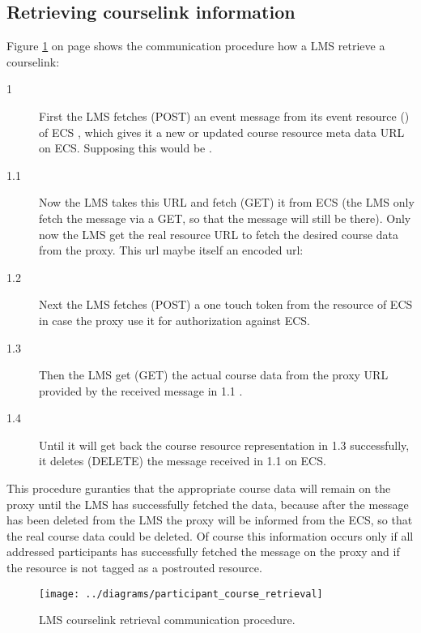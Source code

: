 \subsection{Retrieving courselink information}
Figure \ref{fig:participant_courselink_retrieval} on page
\pageref{fig:participant_courselink_retrieval} shows the communication procedure
how a LMS retrieve a courselink:
\begin{description}
  \item[1] First the LMS fetches (POST)  an event message from its event resource
  () of ECS , which gives it a new or updated course
  resource meta data URL on ECS. Supposing this would be .
  \item[1.1] Now the LMS takes this URL and fetch (GET) it from ECS (the LMS
  only fetch the message via a GET, so that the message will still be there).
  Only now the LMS get the real resource URL to fetch the desired course data
  from the proxy. This url maybe itself an encoded url:
  \item[1.2] Next the LMS fetches (POST) a one touch token from the 
  resource of ECS in case the proxy use it for authorization against ECS.
  \item[1.3] Then the LMS get (GET) the actual course data from the proxy URL
  provided by the received message in 1.1 . 
  \item[1.4] Until it will get back the course resource representation in 1.3
  successfully, it deletes (DELETE) the message 
  received in 1.1 on ECS.
\end{description}
This procedure guranties that the appropriate course data will remain on the
proxy until the LMS has successfully fetched the data, because after the
message  has been deleted from the LMS the proxy
will be informed from the ECS, so that the real course data  could be deleted.
Of course this information occurs only if all addressed participants has
successfully fetched the message on the proxy and if the
 resource is not tagged as a postrouted resource. 

\begin{figure}[p]
\noindent \begin{centering}
\texttt{[image: ../diagrams/participant\_course\_retrieval]}
\par\end{centering}
\caption[LMS courselink retrieval]{\label{fig:participant_courselink_retrieval}LMS courselink retrieval communication procedure.}
\end{figure}
